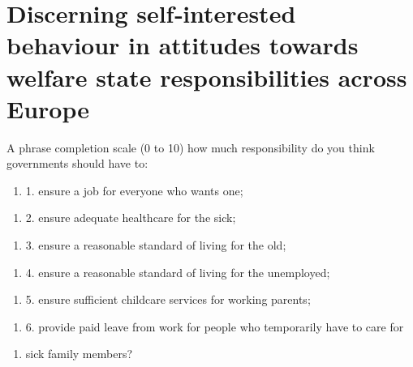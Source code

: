 \section*{Discerning self‐interested behaviour in attitudes towards welfare state responsibilities across Europe \cite{baslevent_discerning_2011}}
A phrase completion scale (0 to 10)
 how much responsibility do you think governments should have to:
\begin{enumerate}
\item  1. ensure a job for everyone who wants one; 
\end{enumerate}
\begin{enumerate}
\item  2. ensure adequate healthcare for the sick;
\end{enumerate}
\begin{enumerate}
\item  3.  ensure a reasonable standard of living for the old; 
\end{enumerate}
\begin{enumerate}
\item  4.  ensure a reasonable standard of living for the unemployed;
\end{enumerate}
\begin{enumerate}
\item  5.  ensure sufficient childcare services for working parents; 
\end{enumerate}
\begin{enumerate}
\item  6.  provide paid leave from work for people who  temporarily have to care for
\end{enumerate}
\begin{enumerate}
\item sick family members?
\end{enumerate}
